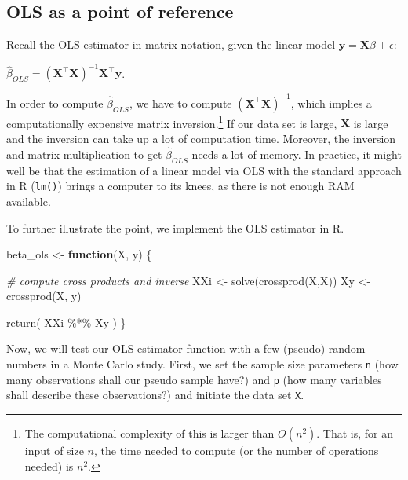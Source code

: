\documentclass[
  12pt,
]{style/krantz}
\newenvironment{Shaded}{\begin{snugshade}}{\end{snugshade}}
\newcommand{\CommentTok}[1]{\textcolor[rgb]{0.56,0.35,0.01}{\textit{#1}}}
\newcommand{\ControlFlowTok}[1]{\textcolor[rgb]{0.13,0.29,0.53}{\textbf{#1}}}
\newcommand{\FunctionTok}[1]{\textcolor[rgb]{0.00,0.00,0.00}{#1}}
\newcommand{\NormalTok}[1]{#1}
\newcommand{\OtherTok}[1]{\textcolor[rgb]{0.56,0.35,0.01}{#1}}
\newcommand{\SpecialCharTok}[1]{\textcolor[rgb]{0.00,0.00,0.00}{#1}}
\begin{document}
\hypertarget{ols-as-a-point-of-reference}{%
\subsection{OLS as a point of reference}\label{ols-as-a-point-of-reference}}

Recall the OLS estimator in matrix notation, given the linear model \(\mathbf{y}=\mathbf{X}\beta + \epsilon\):

\(\hat{\beta}_{OLS} = (\mathbf{X}^\intercal\mathbf{X})^{-1}\mathbf{X}^{\intercal}\mathbf{y}\).

In order to compute \(\hat{\beta}_{OLS}\), we have to compute \((\mathbf{X}^\intercal\mathbf{X})^{-1}\), which implies a computationally expensive matrix inversion.\footnote{The computational complexity of this is larger than \(O(n^{2})\). That is, for an input of size \(n\), the time needed to compute (or the number of operations needed) is \(n^2\).} If our data set is large, \(\mathbf{X}\) is large and the inversion can take up a lot of computation time. Moreover, the inversion and matrix multiplication to get \(\hat{\beta}_{OLS}\) needs a lot of memory. In practice, it might well be that the estimation of a linear model via OLS with the standard approach in R (\texttt{lm()}) brings a computer to its knees, as there is not enough RAM available.

To further illustrate the point, we implement the OLS estimator in R.

\begin{Shaded}
\begin{Highlighting}[]
\NormalTok{beta\_ols }\OtherTok{\textless{}{-}} 
     \ControlFlowTok{function}\NormalTok{(X, y) \{}
          
          \CommentTok{\# compute cross products and inverse}
\NormalTok{          XXi }\OtherTok{\textless{}{-}} \FunctionTok{solve}\NormalTok{(}\FunctionTok{crossprod}\NormalTok{(X,X))}
\NormalTok{          Xy }\OtherTok{\textless{}{-}} \FunctionTok{crossprod}\NormalTok{(X, y) }
          
          \FunctionTok{return}\NormalTok{( XXi  }\SpecialCharTok{\%*\%}\NormalTok{ Xy )}
\NormalTok{     \}}
\end{Highlighting}
\end{Shaded}

Now, we will test our OLS estimator function with a few (pseudo) random numbers in a Monte Carlo study. First, we set the sample size parameters \texttt{n} (how many observations shall our pseudo sample have?) and \texttt{p} (how many variables shall describe these observations?) and initiate the data set \texttt{X}.
\end{document}

